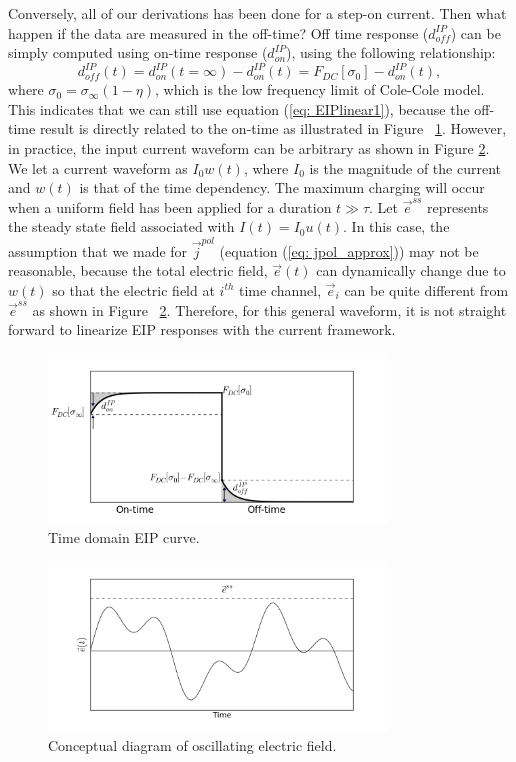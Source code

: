 \documentclass[a4paper, 11pt]{article}
\newcommand{\siginf}{\sigma_\infty}
\renewcommand {\j}  { {\vec j} }
\newcommand {\e}  { {\vec e} }
\newcommand{\dip}{d^{IP}}
\begin{document}
Conversely, all of our derivations has been done for a step-on current. Then what happen if the data are measured in the off-time? Off time response ($\dip_{off}$) can be simply computed using on-time response ($\dip_{on}$), using the following relationship:
\begin{equation}
  \dip_{off}(t) = \dip_{on}(t=\infty) - \dip_{on}(t) = F_{DC}[\sigma_0] - \dip_{on}(t),
\end{equation}
where $\sigma_0 = \siginf(1-\eta)$, which is the low frequency limit of Cole-Cole model. This indicates that we can still use equation (\ref{eq: EIPlinear1}), because the off-time result is directly related to the on-time as illustrated in Figure ~\ref{Fig:EIPcurve}. However, in practice, the input current waveform can be arbitrary as shown in Figure \ref{Fig:Oscillating_e}. We let a current waveform as $I_0w(t)$, where $I_0$ is the magnitude of the current and $w(t)$ is that of the time dependency. The maximum charging will occur when a uniform field has been applied for a duration $t \gg \tau$. Let $\e^{ss}$ represents the steady state field associated with $I(t) = I_0u(t)$. In this case, the assumption that we made for $\j^{pol}$ (equation (\ref{eq: jpol_approx})) may not be reasonable, because the total electric field, $\e(t)$ can dynamically change due to $w(t)$ so that the electric field at $i^{th}$ time channel, $\e_i$ can be quite different from $\e^{ss}$ as shown in Figure ~\ref{Fig:Oscillating_e}. Therefore, for this general waveform, it is not straight forward to linearize EIP responses with the current framework. 

\begin{figure}[htb]
  \centering
  \includegraphics[width=0.8\textwidth]{figures/EIPcurve.png}
  \caption{Time domain EIP curve. }
  \label{Fig:EIPcurve}
\end{figure}
\begin{figure}[htb]
  \centering
  \includegraphics[width=0.8\textwidth]{figures/Oscillating_e.png}
  \caption{Conceptual diagram of oscillating electric field.}
  \label{Fig:Oscillating_e}
\end{figure}
\clearpage
\end{document}
